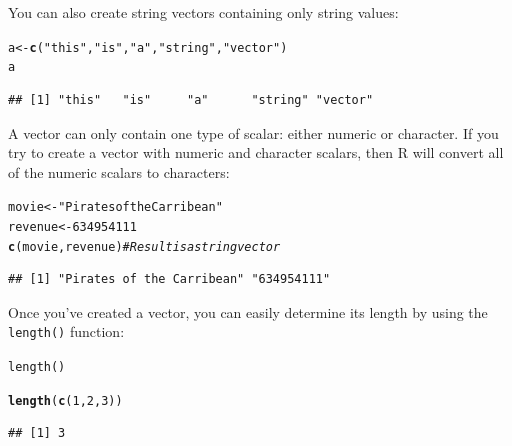 \documentclass{tufte-book}\usepackage[]{graphicx}\usepackage[]{color}
\makeatletter
\newcommand{\hlnum}[1]{\textcolor[rgb]{0.686,0.059,0.569}{#1}}%
\newcommand{\hlstr}[1]{\textcolor[rgb]{0.192,0.494,0.8}{#1}}%
\newcommand{\hlcom}[1]{\textcolor[rgb]{0.678,0.584,0.686}{\textit{#1}}}%
\newcommand{\hlstd}[1]{\textcolor[rgb]{0.345,0.345,0.345}{#1}}%
\newcommand{\hlkwb}[1]{\textcolor[rgb]{0.69,0.353,0.396}{#1}}%
\newcommand{\hlkwd}[1]{\textcolor[rgb]{0.737,0.353,0.396}{\textbf{#1}}}%
\newenvironment{kframe}{%
 \def\at@end@of@kframe{}%
 \ifinner\ifhmode%
  \def\at@end@of@kframe{\end{minipage}}%
  \begin{minipage}{\columnwidth}%
 \fi\fi%
 \def\FrameCommand##1{\hskip\@totalleftmargin \hskip-\fboxsep
 \colorbox{shadecolor}{##1}\hskip-\fboxsep
     \hskip-\linewidth \hskip-\@totalleftmargin \hskip\columnwidth}%
 \MakeFramed {\advance\hsize-\width
   \@totalleftmargin\z@ \linewidth\hsize
   \@setminipage}}%
 {\par\unskip\endMakeFramed%
 \at@end@of@kframe}
\newenvironment{knitrout}{}{} %
\newcommand{\newfun}[1]{\begin{LARGE} \begin{center} \texttt{#1} \end{center} \end{LARGE}}
\makeatother
\begin{document}
You can also create string vectors containing only string values:

\begin{knitrout}
\color{fgcolor}\begin{kframe}
\begin{alltt}
\hlstd{a} \hlkwb{<-} \hlkwd{c}\hlstd{(}\hlstr{"this"}\hlstd{,} \hlstr{"is"}\hlstd{,} \hlstr{"a"}\hlstd{,} \hlstr{"string"}\hlstd{,} \hlstr{"vector"}\hlstd{)}
\hlstd{a}
\end{alltt}
\begin{verbatim}
## [1] "this"   "is"     "a"      "string" "vector"
\end{verbatim}
\end{kframe}
\end{knitrout}



A vector can only contain one type of scalar: either numeric or character. If you try to create a vector with numeric and character scalars, then R will convert all of the numeric scalars to characters:


\begin{knitrout}
\color{fgcolor}\begin{kframe}
\begin{alltt}
\hlstd{movie} \hlkwb{<-} \hlstr{"Pirates of the Carribean"}
\hlstd{revenue} \hlkwb{<-} \hlnum{634954111}
\hlkwd{c}\hlstd{(movie, revenue)} \hlcom{# Result is a string vector}
\end{alltt}
\begin{verbatim}
## [1] "Pirates of the Carribean" "634954111"
\end{verbatim}
\end{kframe}
\end{knitrout}


Once you've created a vector, you can easily determine its length by using the \texttt{length()} function:

\newfun{length()}

\begin{knitrout}
\color{fgcolor}\begin{kframe}
\begin{alltt}
\hlkwd{length}\hlstd{(}\hlkwd{c}\hlstd{(}\hlnum{1}\hlstd{,} \hlnum{2}\hlstd{,} \hlnum{3}\hlstd{))}
\end{alltt}
\begin{verbatim}
## [1] 3
\end{verbatim}
\end{kframe}
\end{knitrout}
\end{document}
